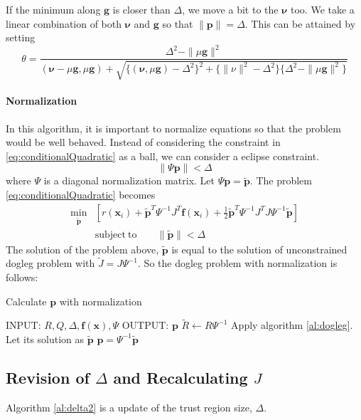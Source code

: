 \documentclass[12pt]{article}
\def\min#1{{\underset{#1}{\mathrm{min}}}}
\def\xb{{\mathbf{x}}}
\def\fb{{\mathbf{f}}}
\def\nub{{\mathbf{\nu}}}
\def\gb{{\mathbf{g}}}
\def\pb{{\mathbf{p}}}
\begin{document}
If the minimum along $\gb$ is closer than $\Delta$, we move a bit to the $\nub$ too. We take a
linear combination of both $\boldsymbol{\nu}$ and $\gb$ so that $\|\pb\| = \Delta$. This can be
attained by setting
\[
\theta = \frac{\Delta^2 - \|\mu \gb \|^2}
{(\nub-\mu\gb,\mu\gb)+\sqrt{\{(\nub,\mu\gb)-\Delta^2\}^2+\{\|\nu\|^2-\Delta^2\} \{\Delta^2-\|\mu\gb\|^2 \}}}
\]

\paragraph{Normalization}
In this algorithm, it is important to normalize equations so that the problem would be well
behaved. Instead of considering the constraint in \eqref{eq:conditionalQuadratic} as a ball, we
can consider a eclipse constraint. 
\[
 \|\Psi \pb\| < \Delta
\]
where  $\Psi$ is a diagonal normalization matrix. Let $\Psi \pb = \tilde{\pb}$. The problem
\eqref{eq:conditionalQuadratic} becomes
\begin{align}
\min{\tilde{\pb}} &\left[ r(\xb_i) +\tilde{\pb}^T\Psi^{-1} J^T\fb(\xb_i)  + 
	\frac{1}{2} \tilde{\pb}^T \Psi^{-1}J^TJ\Psi^{-1}\tilde{\pb}\right] 
\label{eq:conditionalQuadratic} \\
&\mathrm{subject \ to}\qquad \|\tilde{\pb}\| < \Delta
\end{align}
The solution of the problem above, $\tilde{\pb}$ is equal to the solution of unconstrained dogleg
problem with $\tilde{J} = J\Psi ^{-1}$. So the dogleg problem with normalization is follows:


\begin{algorithm}[ht]
\caption{Calculate  $\pb$ with normalization}
 \label{al:delta}
\begin{algorithmic}[1]
\STATE INPUT: $R,Q,\Delta,\fb(\xb),\Psi $
\STATE OUTPUT: $\pb$
\STATE $ \tilde{R} \leftarrow R \Psi^{-1}$
\STATE Apply algorithm \ref{al:dogleg}. Let its solution as $\tilde{\pb}$
\STATE $\pb = \Psi^{-1} \tilde{\pb} $
\end{algorithmic}
\end{algorithm}



\subsection{Revision of $\Delta$ and Recalculating $J$}
Algorithm \ref{al:delta2} is a update of the trust region size, $\Delta$.
\end{document}
